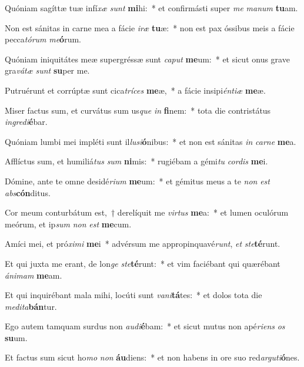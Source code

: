 \item Quóniam sagíttæ tuæ infí\textit{xæ} \textit{sunt} \textbf{mi}hi:~* et confirmásti super \textit{me} \textit{ma}\textit{num} \textbf{tu}am.
\item Non est sánitas in carne mea a fácie \textit{i}\textit{ræ} \textbf{tu}æ:~* non est pax óssibus meis a fácie pecca\textit{tó}\textit{rum} \textit{me}\textbf{ó}rum.
\item Quóniam iniquitátes meæ supergréssæ sunt \textit{ca}\textit{put} \textbf{me}um:~* et sicut onus grave gra\textit{vá}\textit{tæ} \textit{sunt} \textbf{su}per me.
\item Putruérunt et corrúptæ sunt cica\textit{trí}\textit{ces} \textbf{me}æ,~* a fácie insipi\textit{én}\textit{ti}\textit{æ} \textbf{me}æ.
\item Miser factus sum, et curvátus sum us\textit{que} \textit{in} \textbf{fi}nem:~* tota die contristátus \textit{in}\textit{gre}\textit{di}\textbf{é}bar.
\item Quóniam lumbi mei impléti sunt il\textit{lu}\textit{si}\textbf{ó}nibus:~* et non est sánitas \textit{in} \textit{car}\textit{ne} \textbf{me}a.
\item Afflíctus sum, et humiliá\textit{tus} \textit{sum} \textbf{ni}mis:~* rugiébam a gémi\textit{tu} \textit{cor}\textit{dis} \textbf{me}i.
\item Dómine, ante te omne desidé\textit{ri}\textit{um} \textbf{me}um:~* et gémitus meus a te \textit{non} \textit{est} \textit{abs}\textbf{cón}ditus.
\item Cor meum conturbátum est,~† derelíquit me \textit{vir}\textit{tus} \textbf{me}a:~* et lumen oculórum meórum, et ip\textit{sum} \textit{non} \textit{est} \textbf{me}cum.
\item Amíci mei, et pró\textit{xi}\textit{mi} \textbf{me}i~* advérsum me appropinquavé\textit{runt}, \textit{et} \textit{ste}\textbf{té}runt.
\item Et qui juxta me erant, de lon\textit{ge} \textit{ste}\textbf{té}runt:~* et vim faciébant qui quærébant \textit{á}\textit{ni}\textit{mam} \textbf{me}am.
\item Et qui inquirébant mala mihi, locúti sunt \textit{va}\textit{ni}\textbf{tá}tes:~* et dolos tota die \textit{me}\textit{di}\textit{ta}\textbf{bán}tur.
\item Ego autem tamquam surdus non \textit{au}\textit{di}\textbf{é}bam:~* et sicut mutus non apé\textit{ri}\textit{ens} \textit{os} \textbf{su}um.
\item Et factus sum sicut ho\textit{mo} \textit{non} \textbf{áu}diens:~* et non habens in ore suo red\textit{ar}\textit{gu}\textit{ti}\textbf{ó}nes.
